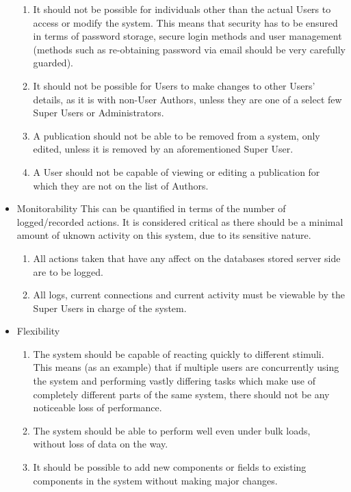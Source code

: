 \begin{itemize}
			\begin{enumerate}
				\item It should not be possible for individuals other than the actual Users to access or modify the system. This means that security has to be ensured in terms of password storage, secure login methods and user management (methods such as re-obtaining password via email should be very carefully guarded).
				\item It should not be possible for Users to make changes to other Users' details, as it is with non-User Authors, unless they are one of a select few Super Users or Administrators.
				\item A publication should not be able to be removed from a system, only edited, unless it is removed by an aforementioned Super User.
				\item A User should not be capable of viewing or editing a publication for which they are not on the list of Authors.
			\end{enumerate}
			\item Monitorability
			This can be quantified in terms of the number of logged/recorded actions. It is considered critical as there should be a minimal amount of uknown activity on this system, due to its sensitive nature. 
			\begin{enumerate}
				\item All actions taken that have any affect on the databases stored server side are to be logged.
				\item All logs, current connections and current activity must be viewable by the Super Users in charge of the system.
			\end{enumerate}
			\item Flexibility
			\begin{enumerate}
				\item The system should be capable of reacting quickly to different stimuli. This means (as an example) that if multiple users are concurrently using the system and performing vastly differing tasks which make use of completely different parts of the same system, there should not be any noticeable loss of performance.
				\item The system should be able to perform well even under bulk loads, without loss of data on the way.
				\item It should be possible to add new components or fields to existing components in the system without making major changes. 
			\end{enumerate}
		\end{itemize}
